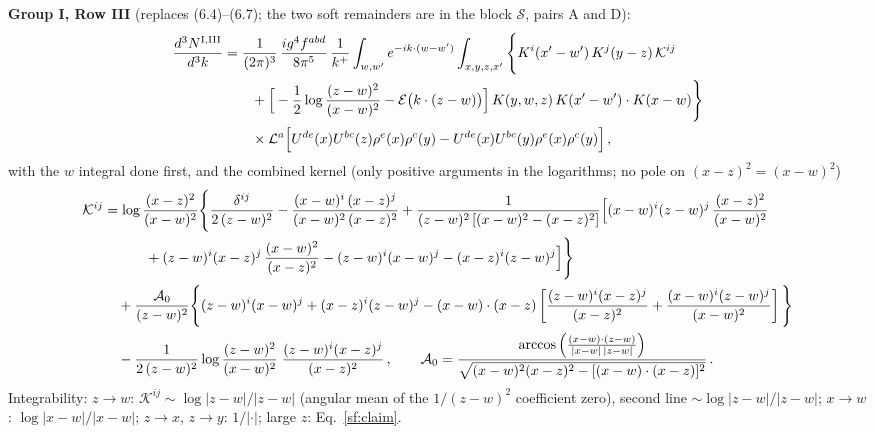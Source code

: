 \noindent\textbf{Group I, Row III} (replaces (6.4)--(6.7); the two soft remainders are in the block $\mathcal{S}$, pairs A and D):
\begin{align}
\frac{d^{3}N^{\rm I,III}}{d^{3}k}&=\frac{1}{(2\pi)^{3}}\,\frac{ig^{4}f^{abd}}{8\pi^{5}}\,\frac{1}{k^{+}}\int_{w,w'}e^{-ik\cdot(w-w')}\int_{x,y,z,x'}\Bigg\{K^{i}(x'-w')\,K^{j}(y-z)\,\mathcal{K}^{ij}\notag\\
&\qquad+\Big[-\frac12\log\frac{(z-w)^{2}}{(x-w)^{2}}-\mathcal{E}\big(k\cdot(z-w)\big)\Big]\,K(y,w,z)\,K(x'-w')\cdot K(x-w)\Bigg\}\notag\\&\qquad\times\mathcal{L}^{a}\Big[U^{de}(x)U^{bc}(z)\rho^{e}(x)\rho^{c}(y)-U^{de}(x)U^{bc}(y)\rho^{e}(x)\rho^{c}(y)\Big]\,,\label{sf:GIIII}
\end{align}
with the $w$ integral done first, and the combined kernel (only positive arguments in the logarithms; no pole on $(x-z)^{2}=(x-w)^{2}$)
\begin{align}
\mathcal{K}^{ij}&=\log\frac{(x-z)^{2}}{(x-w)^{2}}\Bigg\{\frac{\delta^{ij}}{2\,(z-w)^{2}}-\frac{(x-w)^{i}\,(x-z)^{j}}{(x-w)^{2}\,(x-z)^{2}}
+\frac{1}{(z-w)^{2}\left[(x-w)^{2}-(x-z)^{2}\right]}\Big[(x-w)^{i}(z-w)^{j}\,\frac{(x-z)^{2}}{(x-w)^{2}}\notag\\
&\qquad\quad+(z-w)^{i}(x-z)^{j}\,\frac{(x-w)^{2}}{(x-z)^{2}}-(z-w)^{i}(x-w)^{j}-(x-z)^{i}(z-w)^{j}\Big]\Bigg\}\notag\\
&\quad+\frac{\mathcal{A}_{0}}{(z-w)^{2}}\Bigg\{(z-w)^{i}(x-w)^{j}+(x-z)^{i}(z-w)^{j}-(x-w)\cdot(x-z)\left[\frac{(z-w)^{i}(x-z)^{j}}{(x-z)^{2}}+\frac{(x-w)^{i}(z-w)^{j}}{(x-w)^{2}}\right]\Bigg\}\notag\\
&\quad-\frac{1}{2\,(z-w)^{2}}\log\frac{(z-w)^{2}}{(x-w)^{2}}\;\frac{(z-w)^{i}(x-z)^{j}}{(x-z)^{2}}\,,\qquad
\mathcal{A}_{0}=\frac{\arccos\Big(\frac{(x-w)\cdot(z-w)}{|x-w|\,|z-w|}\Big)}{\sqrt{(x-w)^{2}(x-z)^{2}-[(x-w)\cdot(x-z)]^{2}}}\,.\label{sf:Kij}
\end{align}
Integrability: $z\to w$: $\mathcal{K}^{ij}\sim\log|z-w|/|z-w|$ (angular mean of the $1/(z-w)^{2}$ coefficient zero), second line $\sim\log|z-w|/|z-w|$; $x\to w$: $\log|x-w|/|x-w|$; $z\to x$, $z\to y$: $1/|\cdot|$; large $z$: Eq.~\eqref{sf:claim}.

